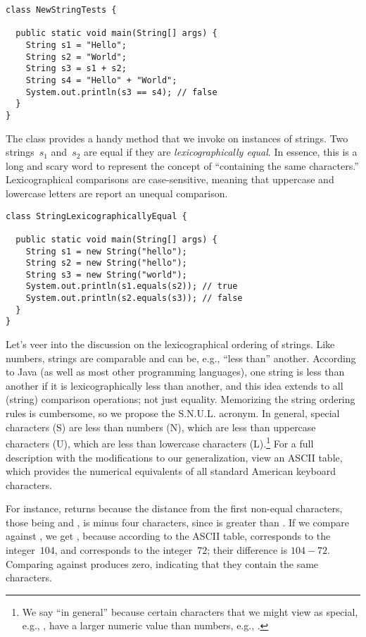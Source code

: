 \begin{lstlisting}[language=MyJava]
class NewStringTests {

  public static void main(String[] args) {
    String s1 = "Hello";
    String s2 = "World";
    String s3 = s1 + s2;
    String s4 = "Hello" + "World";
    System.out.println(s3 == s4); // false
  }
}
\end{lstlisting}

The  class provides a handy  method that we invoke on instances of strings. 
Two strings~$s_1$ and~$s_2$ are equal if they are \emph{lexicographically equal}. 
In essence, this is a long and scary word to represent the concept of ``containing the same characters.'' 
Lexicographical comparisons are case-sensitive, meaning that uppercase and lowercase letters are report an unequal comparison.

\begin{lstlisting}[language=MyJava]
class StringLexicographicallyEqual {

  public static void main(String[] args) {
    String s1 = new String("hello");
    String s2 = new String("hello");
    String s3 = new String("world");
    System.out.println(s1.equals(s2)); // true
    System.out.println(s2.equals(s3)); // false
  }
}
\end{lstlisting}

Let's veer into the discussion on the lexicographical ordering of strings. 
Like numbers, strings are comparable and can be, e.g., ``less than'' another. 
According to Java (as well as most other programming languages), one string is less than another if it is lexicographically less than another, and this idea extends to all (string) comparison operations; not just equality. 
Memorizing the string ordering rules is cumbersome, so we propose the S.N.U.L. acronym. 
In general, special characters (S) are less than numbers (N), which are less than uppercase characters (U), which are less than lowercase characters (L).\footnote{We say ``in general'' because certain characters that we might view as special, e.g., , have a larger numeric value than numbers, e.g., \ttt{\q{}2\q{}}.} 
For a full description with the modifications to our generalization, view an ASCII table, which provides the numerical equivalents of all standard American keyboard characters. 

For instance,  returns  because the distance from the first non-equal characters, those being  and , is minus four characters, since  is greater than . 
If we compare  against , we get , because according to the ASCII table,  corresponds to the integer~$104$, and  corresponds to the integer~$72$; their difference is $104 - 72$. 
Comparing  against  produces zero, indicating that they contain the same characters.

